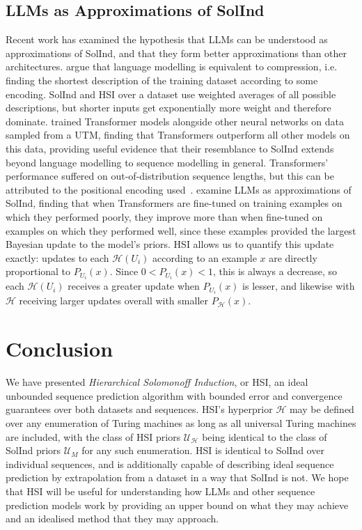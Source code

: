 \documentclass[11pt]{article}
\newcommand{\Eta}{\mathcal{H}}
\begin{document}
\subsection{LLMs as Approximations of SolInd}
Recent work has examined the hypothesis that LLMs can be understood as approximations of SolInd, and that they form better approximations than other architectures.
\citet{Deletang2023} argue that language modelling is equivalent to compression, i.e. finding the shortest description of the training dataset according to some encoding. SolInd and HSI over a dataset use weighted averages of all possible descriptions, but shorter inputs get exponentially more weight and therefore dominate.
\citet{Grau-Moya2024} trained Transformer models alongside other neural networks on data sampled from a UTM, finding that Transformers outperform all other models on this data, providing useful evidence that their resemblance to SolInd extends beyond language modelling to sequence modelling in general.
Transformers' performance suffered on out-of-distribution sequence lengths, but this can be attributed to the positional encoding used~\citep{genewein2026algorithmic}.
\citet{Wan2024} examine LLMs as approximations of SolInd, finding that when Transformers are fine-tuned on training examples on which they performed poorly, they improve more than when fine-tuned on examples on which they performed well, since these examples provided the largest Bayesian update to the model's priors.
HSI allows us to quantify this update exactly: updates to each $\Eta(U_i)$ according to an example $x$ are directly proportional to $P_{U_i}(x)$. Since $0<P_{U_i}(x)<1$, this is always a decrease, so each $\Eta(U_i)$ receives a greater update when $P_{U_i}(x)$ is lesser, and likewise with $\Eta$ receiving larger updates overall with smaller $P_\Eta(x)$.


\section{Conclusion}
We have presented \textit{Hierarchical Solomonoff Induction}, or HSI, an ideal unbounded sequence prediction algorithm with bounded error and convergence guarantees over both datasets and sequences.
HSI's hyperprior $\Eta$ may be defined over any enumeration of Turing machines as long as all universal Turing machines are included, with the class of HSI priors $\mathcal{U}_\Eta$ being identical to the class of SolInd priors $\mathcal{U}_M$ for any such enumeration.
HSI is identical to SolInd over individual sequences, and is additionally capable of describing ideal sequence prediction by extrapolation from a dataset in a way that SolInd is not.
We hope that HSI will be useful for understanding how LLMs and other sequence prediction models work by providing an upper bound on what they may achieve and an idealised method that they may approach.
\end{document}
